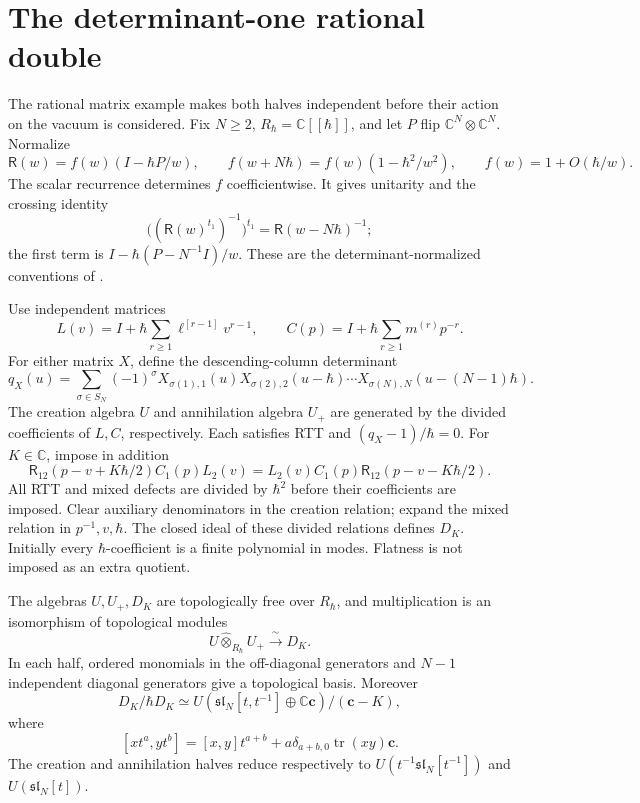 \section{The determinant-one rational double}
\label{cyrep:sec:rtt-double}

The rational matrix example makes both halves independent before
their action on the vacuum is considered.
Fix \(N\geq2\), \(R_\hbar=\mathbb C[[\hbar]]\), and let \(P\)
flip \(\mathbb C^N\otimes\mathbb C^N\).
Normalize
\begin{equation}\label{cyrep:eq:normalized-R}
 \mathsf R(w)=f(w)(I-\hbar P/w),\qquad
 f(w+N\hbar)=f(w)(1-\hbar^2/w^2),\qquad f(w)=1+O(\hbar/w).
\end{equation}
The scalar recurrence determines \(f\) coefficientwise.
It gives unitarity and the crossing identity
\[
 \bigl((\mathsf R(w)^{t_1})^{-1}\bigr)^{t_1}
                 =\mathsf R(w-N\hbar)^{-1};
\]
the first term is \(I-\hbar(P-N^{-1}I)/w\).
These are the determinant-normalized conventions of
\cite[Sections 1.1--1.6]{EtingofKazhdanIV}.

Use independent matrices
\[
 L(v)=I+\hbar\sum_{r\geq1}\ell^{[r-1]}v^{r-1},
 \qquad C(p)=I+\hbar\sum_{r\geq1}m^{(r)}p^{-r}.
\]
For either matrix \(X\), define the descending-column determinant
\[
 q_X(u)=\sum_{\sigma\in S_N}(-1)^\sigma
 X_{\sigma(1),1}(u)X_{\sigma(2),2}(u-\hbar)\cdots
 X_{\sigma(N),N}(u-(N-1)\hbar).
\]
The creation algebra \(U\) and annihilation algebra \(U_+\)
are generated by the divided coefficients of \(L,C\), respectively.
Each satisfies RTT and \((q_X-1)/\hbar=0\).
For \(K\in\mathbb C\), impose in addition
\begin{equation}\label{cyrep:eq:mixed-RTT}
 \mathsf R_{12}(p-v+K\hbar/2)C_1(p)L_2(v)
 =L_2(v)C_1(p)\mathsf R_{12}(p-v-K\hbar/2).
\end{equation}
All RTT and mixed defects are divided by \(\hbar^2\) before
their coefficients are imposed. Clear auxiliary denominators
in the creation relation; expand the mixed relation in
\(p^{-1},v,\hbar\).
The closed ideal of these divided relations defines \(D_K\).
Initially every \(\hbar\)-coefficient is a finite polynomial
in modes. Flatness is not imposed as an extra quotient.

\begin{theorem}\label{cyrep:thm:rtt-pbw}
The algebras \(U,U_+,D_K\) are topologically free over \(R_\hbar\),
and multiplication is an isomorphism of topological modules
\begin{equation}\label{cyrep:eq:rtt-factorization}
 U\widehat\otimes_{R_\hbar}U_+\xrightarrow{\ \sim\ }D_K.
\end{equation}
In each half, ordered monomials in the off-diagonal generators
and \(N-1\) independent diagonal generators give a topological basis.
Moreover
\[
 D_K/\hbar D_K\simeq
 U(\mathfrak{sl}_N[t,t^{-1}]\oplus\mathbb C\mathbf c)/
                         (\mathbf c-K),
\]
where
\[
 [xt^a,yt^b]=[x,y]t^{a+b}
       +a\delta_{a+b,0}\operatorname{tr}(xy)\mathbf c.
\]
The creation and annihilation halves reduce respectively to
\(U(t^{-1}\mathfrak{sl}_N[t^{-1}])\) and
\(U(\mathfrak{sl}_N[t])\).
\end{theorem}

